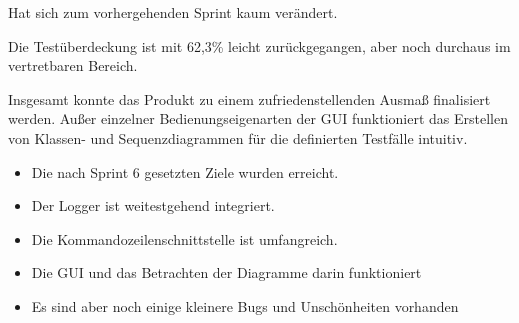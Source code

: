
\nsecend


\nsecend %


\nsecend%


\nsecend%


\nsecend


\nsecend

Hat sich zum vorhergehenden Sprint kaum verändert.
\nsecend%

Die Testüberdeckung ist mit 62,3\% leicht zurückgegangen, aber noch durchaus im vertretbaren Bereich.
\nsecend%


\nsecend%

Insgesamt konnte das Produkt zu einem zufriedenstellenden Ausmaß finalisiert werden. Außer einzelner Bedienungseigenarten der GUI funktioniert das Erstellen von Klassen- und Sequenzdiagrammen für die definierten Testfälle intuitiv.
\nsecend%

\begin{itemize}
\item Die nach Sprint 6 gesetzten Ziele wurden erreicht.
\item Der Logger ist weitestgehend integriert.
\item Die Kommandozeilenschnittstelle ist umfangreich.
\item Die GUI und das Betrachten der Diagramme darin funktioniert
\item Es sind aber noch einige kleinere Bugs und Unschönheiten vorhanden
\end{itemize}
\nsecend%